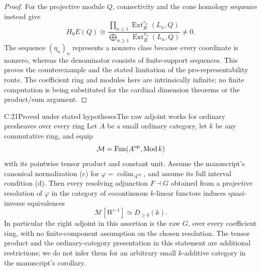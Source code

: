 \begin{proof}
For the projective module $Q$, connectivity and the cone homology sequence instead give
\[
 H_0E(Q)\cong
 \frac{\displaystyle\prod_{n\geq1}
          \operatorname{Ext}^{r_n}_R(L_n,Q)}
      {\displaystyle\bigoplus_{n\geq1}
          \operatorname{Ext}^{r_n}_R(L_n,Q)}\ne0.
\]
The sequence $(\eta_n)_n$ represents a nonzero class because every coordinate is nonzero, whereas the denominator consists of finite-support sequences. This proves the counterexample and the stated limitation of the pro-representability route. The coefficient ring and modules here are intrinsically infinite; no finite computation is being substituted for the cardinal dimension theorems or the product/sum argument.
\end{proof}



\begin{claim}{C.21}{Proved under stated hypotheses}{The raw adjoint works for ordinary presheaves over every ring}\label{C21}
Let $A$ be a small ordinary category, let $k$ be any commutative ring, and equip
\[
 \mathcal M=\operatorname{Fun}(A^{\mathrm{op}},\operatorname{Mod} k)
\]
with its pointwise tensor product and constant unit. Assume the manuscript's canonical normalization (c) for $\varphi=\operatorname{colim}_{A^{\mathrm{op}}}$, and assume its full interval condition (d). Then every resolving adjunction $F\dashv G$ obtained from a projective resolution of $\varphi$ in the category of cocontinuous $k$-linear functors induces quasi-inverse equivalences
\[
 \mathcal M[W^{-1}]\simeq D_{\geq0}(k).
\]
In particular the right adjoint in this assertion is the raw $G$, over every coefficient ring, with no finite-component assumption on the chosen resolution. The tensor product and the ordinary-category presentation in this statement are additional restrictions; we do not infer them for an arbitrary small $k$-additive category in the manuscript's corollary.
\end{claim}
